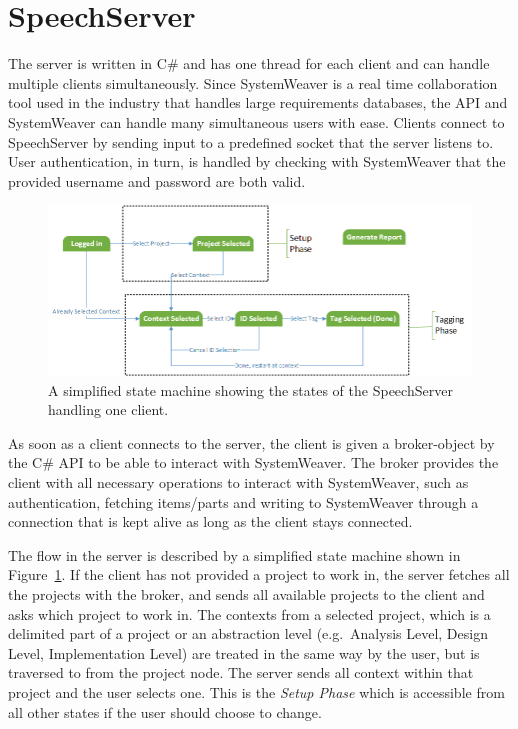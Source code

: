 \section{SpeechServer}
\label{sec:speechserver}
The server is written in C\# and has one thread for each client and can handle multiple clients simultaneously. Since SystemWeaver is a real time collaboration tool used in the industry that handles large requirements databases, the API and SystemWeaver can handle many simultaneous users with ease. Clients connect to SpeechServer by sending input to a predefined socket that the server listens to.
User authentication, in turn, is handled by checking with SystemWeaver that the provided username and password are both valid.

\begin{figure}[h]
\centering
\includegraphics[width = 400pt, keepaspectratio = true]{fig/serverFlow}
\caption{A simplified state machine showing the states of the SpeechServer handling one client.}
\label{fig:serverFlow}
\end{figure}

As soon as a client connects to the server, the client is given a broker-object by the C\# API to be able to interact with SystemWeaver. 
The broker provides the client with all necessary operations to interact with SystemWeaver, such as authentication, fetching items/parts and writing to SystemWeaver through a connection that is kept alive as long as the client stays connected. 

The flow in the server is described by a simplified state machine shown in Figure~\ref{fig:serverFlow}. If the client has not provided a project to work in, the server fetches all the projects with the broker, and sends all available projects to the client and asks which project to work in. The contexts from a selected project, which is a delimited part of a project or an abstraction level (e.g.\ Analysis Level, Design Level, Implementation Level) are treated in the same way by the user, but is traversed to from the project node. The server sends all context within that project and the user selects one. This is the \emph{Setup Phase} which is accessible from all other states if the user should choose to change.

